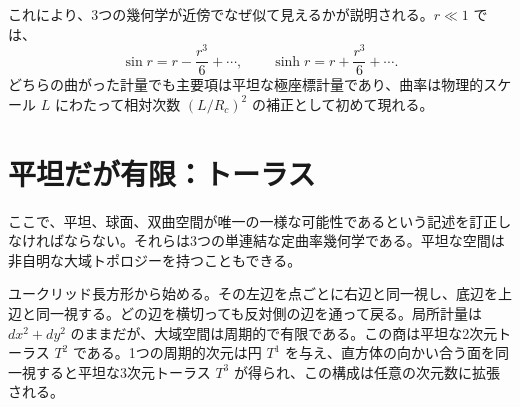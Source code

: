 \begin{classroomqa}
\end{classroomqa}

これにより、3つの幾何学が近傍でなぜ似て見えるかが説明される。\(r\ll1\) では、
\begin{equation}
\sin r=r-\frac{r^3}{6}+\cdots,
\qquad
\sinh r=r+\frac{r^3}{6}+\cdots.
\end{equation}
どちらの曲がった計量でも主要項は平坦な極座標計量であり、曲率は物理的スケール \(L\) にわたって相対次数 \((L/R_c)^2\) の補正として初めて現れる。

\begin{classroomqa}
\end{classroomqa}

\section{平坦だが有限：トーラス}

ここで、平坦、球面、双曲空間が唯一の一様な可能性であるという記述を訂正しなければならない。それらは3つの単連結な定曲率幾何学である。平坦な空間は非自明な大域トポロジーを持つこともできる。

ユークリッド長方形から始める。その左辺を点ごとに右辺と同一視し、底辺を上辺と同一視する。どの辺を横切っても反対側の辺を通って戻る。局所計量は \(dx^2+dy^2\) のままだが、大域空間は周期的で有限である。この商は平坦な2次元トーラス \(T^2\) である。1つの周期的次元は円 \(T^1\) を与え、直方体の向かい合う面を同一視すると平坦な3次元トーラス \(T^3\) が得られ、この構成は任意の次元数に拡張される。


